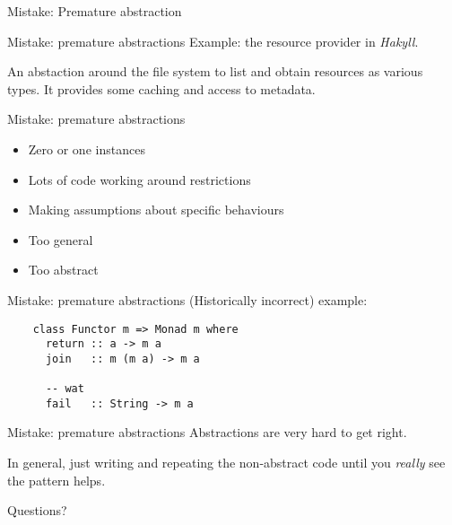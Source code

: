 \documentclass[20pt]{beamer}
\newcommand{\vspaced}{
    \vspace{5mm}
}
\newcommand{\chapterslide}[1]{
    {
        \begin{frame}[plain]
        \begin{center}
        \large{#1}
        \end{center}
        \end{frame}
    }
}
\begin{document}

\chapterslide{Mistake: Premature abstraction}

\begin{frame}{Mistake: premature abstractions}
    Example: the resource provider in \emph{Hakyll}. \\
    \vspaced
    An abstaction around the file system to list and obtain resources as various
    types. It provides some caching and access to metadata.
\end{frame}

\begin{frame}{Mistake: premature abstractions}
    \begin{itemize}
    \item Zero or one instances
    \item Lots of code working around restrictions
    \item Making assumptions about specific behaviours
    \item Too general
    \item Too abstract
    \end{itemize}
\end{frame}

\begin{frame}[fragile]{Mistake: premature abstractions}
    (Historically incorrect) example: \\
    \vspaced
    \begin{lstlisting}
    class Functor m => Monad m where
      return :: a -> m a
      join   :: m (m a) -> m a

      -- wat
      fail   :: String -> m a
    \end{lstlisting}
\end{frame}

\begin{frame}{Mistake: premature abstractions}
    Abstractions are very hard to get right. \\
    \vspaced
    In general, just writing and repeating the non-abstract code until you
    \emph{really} see the pattern helps.
\end{frame}

\chapterslide{Questions?}
\end{document}
